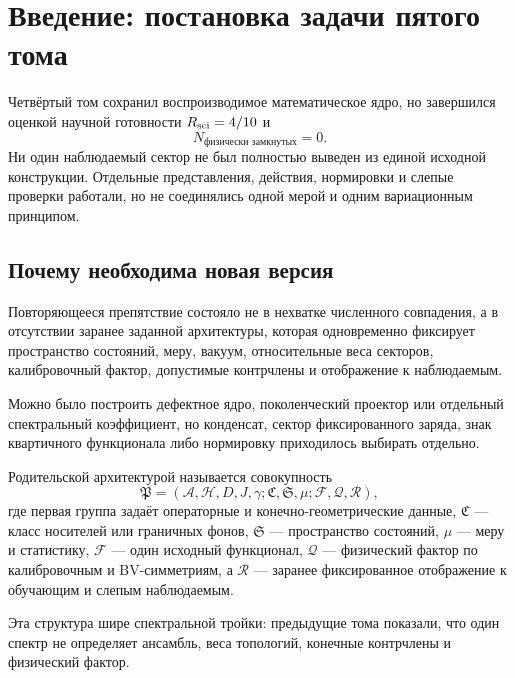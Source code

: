 \chapter{Введение: постановка задачи пятого тома}

Четвёртый том сохранил воспроизводимое математическое ядро, но завершился
оценкой научной готовности \(R_{\rm sci}=4/10\) и
\begin{equation}N_{\text{физически замкнутых}}=0.\end{equation}
Ни один наблюдаемый сектор не был полностью выведен из единой исходной
конструкции. Отдельные представления, действия, нормировки и слепые проверки
работали, но не соединялись одной мерой и одним вариационным принципом.

\section{Почему необходима новая версия}

Повторяющееся препятствие состояло не в нехватке численного совпадения, а в
отсутствии заранее заданной архитектуры, которая одновременно фиксирует
пространство состояний, меру, вакуум, относительные веса секторов,
калибровочный фактор, допустимые контрчлены и отображение к наблюдаемым.

Можно было построить дефектное ядро, поколенческий проектор или отдельный
спектральный коэффициент, но конденсат, сектор фиксированного заряда, знак
квартичного функционала либо нормировку приходилось выбирать отдельно.

\begin{definition}
Родительской архитектурой называется совокупность
\begin{equation}
 \mathfrak P=
 (\mathcal A,\mathcal H,D,J,\gamma;
  \mathfrak C,\mathfrak S,\mu;
  \mathcal F,\mathcal Q,\mathcal R),
\end{equation}
где первая группа задаёт операторные и конечно-геометрические данные,
\(\mathfrak C\) --- класс носителей или граничных фонов,
\(\mathfrak S\) --- пространство состояний, \(\mu\) --- меру и статистику,
\(\mathcal F\) --- один исходный функционал, \(\mathcal Q\) --- физический
фактор по калибровочным и BV-симметриям, а \(\mathcal R\) --- заранее
фиксированное отображение к обучающим и слепым наблюдаемым.
\end{definition}

Эта структура шире спектральной тройки: предыдущие тома показали, что один
спектр не определяет ансамбль, веса топологий, конечные контрчлены и
физический фактор.

